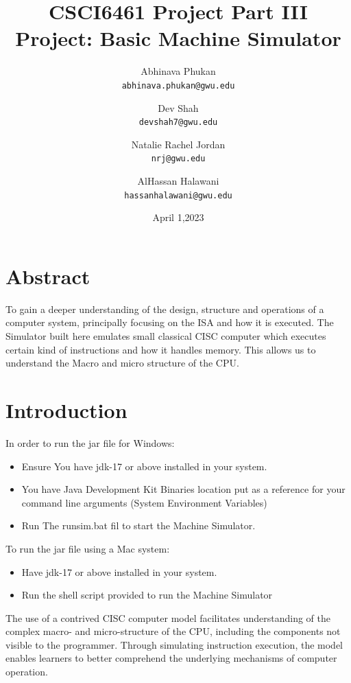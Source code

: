 \documentclass[10pt]{article}
\title{%
  \textbf{\huge CSCI6461 Project Part III} \\
  \Large Project: Basic Machine Simulator
}
\author{
  Abhinava Phukan\\
  \texttt{abhinava.phukan@gwu.edu}
  \and
  Dev Shah\\
  \texttt{devshah7@gwu.edu}
  \and
  Natalie Rachel Jordan\\
  \texttt{nrj@gwu.edu}
  \and
  AlHassan Halawani\\
  \texttt{hassanhalawani@gwu.edu}
}
\date{April 1,2023}
\begin{document}
\maketitle

\section*{Abstract}
To gain a deeper understanding of the design, structure and operations of a computer
system, principally focusing on the ISA and how it is executed. The Simulator built here
emulates small classical CISC computer which executes certain kind of instructions and how it handles
memory. This allows us to understand the Macro and micro structure of the CPU.

\section{Introduction}\label{section 1}
In order to run the jar file for Windows:\label{windowsetup}
\begin{itemize}[label=--]
  \item Ensure You have jdk-17 or above installed in your system.
  \item You have Java Development Kit Binaries location put as a reference for your command line arguments (System Environment Variables)
  \item Run The runsim.bat fil to start the Machine Simulator.
\end{itemize}
To run the jar file using a Mac system:\label{macsetup}
\begin{itemize}[label=--]
  \item Have jdk-17 or above installed in your system.
  \item Run the shell script provided to run the Machine Simulator
\end{itemize}
The use of a contrived CISC computer model facilitates understanding of the complex macro- 
and micro-structure of the CPU, including the components not visible to the programmer. 
Through simulating instruction execution, the model enables learners to better comprehend 
the underlying mechanisms of computer operation.
\end{document}
